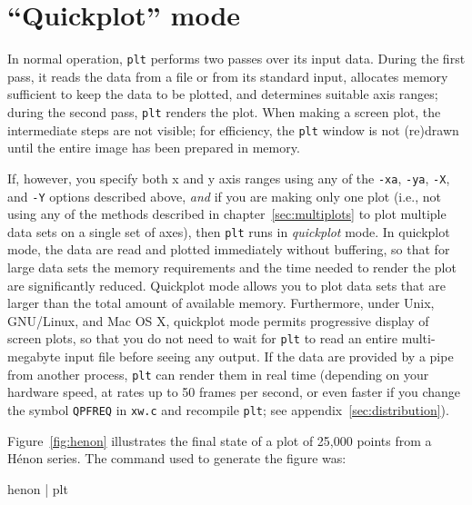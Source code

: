 \documentclass{book}
\begin{document}
\section{``Quickplot'' mode \label{sec:quickplot}}

%
In normal operation, {\tt plt} performs two passes over its input data.  During
the first pass, it reads the data from a file or from its standard input,
allocates memory sufficient to keep the data to be plotted, and determines
suitable axis ranges; during the second pass, {\tt plt} renders the plot.  When
making a screen plot, the intermediate steps are not visible; for efficiency,
the {\tt plt} window is not (re)drawn until the entire image has been prepared
in memory.

%
%
%
%
%
%
%
%
%
If, however, you specify both x and y axis ranges using any of the {\tt -xa},
{\tt -ya}, {\tt -X}, and {\tt -Y} options described above, {\em and} if you are
making only one plot (i.e., not using any of the methods described in
chapter~\ref{sec:multiplots} to plot multiple data sets on a single set of
axes), then {\tt plt} runs in {\em quickplot} mode.  In quickplot mode, the
data are read and plotted immediately without buffering, so that for large data
sets the memory requirements and the time needed to render the plot are
significantly reduced.  Quickplot mode allows you to plot data sets that
are larger than the total amount of available memory.  Furthermore, under Unix,
GNU/Linux, and Mac OS X, quickplot mode permits progressive display of
screen plots, so that you do not need to wait for {\tt plt} to read an
entire multi-megabyte input file before seeing any output.  If the data are
provided by a pipe from another process, {\tt plt} can render them in real
time (depending on your hardware speed, at rates up to 50 frames per second,
or even faster if you change the symbol {\tt QPFREQ} in {\tt xw.c} and
recompile {\tt plt}; see appendix~\ref{sec:distribution}).

Figure~\ref{fig:henon} illustrates the final state of a plot of 25,000 points
from a H\'{e}non series.  The command used to generate the figure was:

\begin{center}
\begin{boxedverbatim}
henon | plt %
\end{boxedverbatim}
\end{center}
\end{document}
